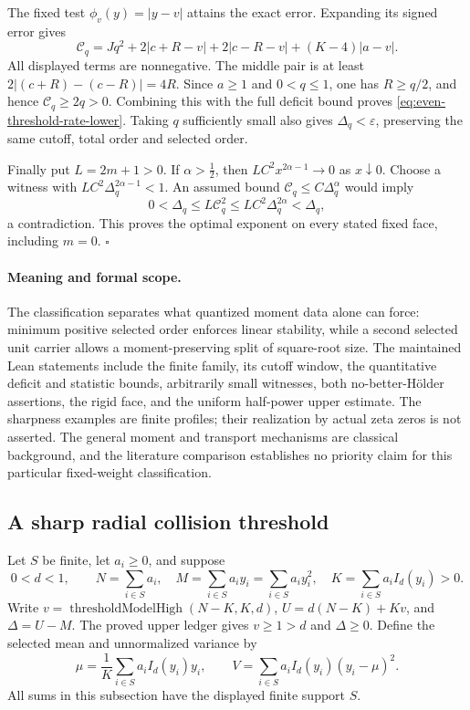 The fixed test \(\phi_v(y)=|y-v|\) attains the exact error.
Expanding its signed error gives
\[
 \mathcal C_q=Jq^2+2|c+R-v|+2|c-R-v|+(K-4)|a-v|.
\]
All displayed terms are nonnegative.  The middle pair is at least
\(2|(c+R)-(c-R)|=4R\).  Since \(a\geq1\) and \(0<q\leq1\),
one has \(R\geq q/2\), and hence \(\mathcal C_q\geq2q>0\).
Combining this with the full deficit bound proves
\eqref{eq:even-threshold-rate-lower}.  Taking \(q\) sufficiently small
also gives \(\Delta_q<\varepsilon\), preserving the same cutoff,
total order and selected order.

Finally put \(L=2m+1>0\).  If \(\alpha>\tfrac12\), then
\(L C^2x^{2\alpha-1}\to0\) as \(x\downarrow0\).
Choose a witness with
\(L C^2\Delta_q^{2\alpha-1}<1\).
An assumed bound \(\mathcal C_q\leq C\Delta_q^\alpha\) would imply
\[
 0<\Delta_q
 \leq L\mathcal C_q^2
 \leq L C^2\Delta_q^{2\alpha}
 <\Delta_q,
\]
a contradiction.  This proves the optimal exponent on every stated
fixed face, including \(m=0\).
\hfill\(\square\)

\paragraph{Meaning and formal scope.}
The classification separates what quantized moment data alone can force:
minimum positive selected order enforces linear stability, while a second
selected unit carrier allows a moment-preserving split of square-root size.
The maintained Lean statements include the finite family, its cutoff window,
the quantitative deficit and statistic bounds, arbitrarily small witnesses,
both no-better-H\"older assertions, the rigid face, and the uniform
half-power upper estimate.  The sharpness examples are finite profiles;
their realization by actual zeta zeros is not asserted.  The general
moment and transport mechanisms are classical background, and the
literature comparison establishes no priority claim for this particular
fixed-weight classification.

\subsection{A sharp radial collision threshold}
\label{subsec:quantized-radial-collision}

Let \(S\) be finite, let \(a_i\ge0\), and suppose
\[
 0<d<1,\qquad
 N=\sum_{i\in S}a_i,\quad
 M=\sum_{i\in S}a_i y_i=\sum_{i\in S}a_i y_i^2,\quad
 K=\sum_{i\in S}a_i I_d(y_i)>0.
\]
Write \(v=\operatorname{thresholdModelHigh}(N-K,K,d)\),
\(U=d(N-K)+Kv\), and \(\Delta=U-M\).  The proved upper ledger gives
\(v\ge1>d\) and \(\Delta\ge0\).  Define the selected mean and
unnormalized variance by
\[
 \mu=\frac1K\sum_{i\in S}a_i I_d(y_i)y_i,\qquad
 V=\sum_{i\in S}a_i I_d(y_i)(y_i-\mu)^2.
\]
All sums in this subsection have the displayed finite support \(S\).

